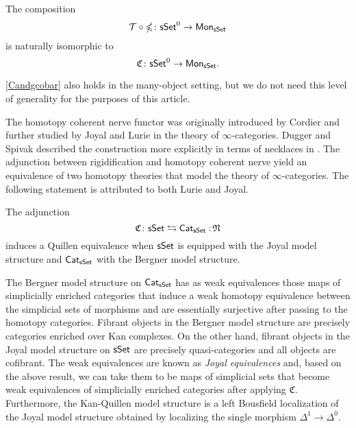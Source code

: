
\begin{proposition}\label{Candgcobar}
	The composition 
	$$\mathcal{T} \circ \operatorname{\mathbb{\Omega}} \colon \mathsf{sSet}^0 \to \mathsf{Mon}_{\mathsf{sSet}}$$ is naturally isomorphic to
	$$\mathfrak{C} \colon \mathsf{sSet}^0 \to \mathsf{Mon}_{\mathsf{sSet}}.$$
\end{proposition}

\cref{Candgcobar} also holds in the many-object setting, but we do not need this level of generality for the purposes of this article.

The homotopy coherent nerve functor was originally introduced by Cordier and further studied by Joyal and Lurie in the theory of $\infty$-categories.
Dugger and Spivak described the construction more explicitly in terms of necklaces in \cite{dugger2011rigidification}.
The adjunction between rigidification and homotopy coherent nerve yield an equivalence of two homotopy theories that model the theory of $\infty$-categories.
The following statement is attributed to both Lurie and Joyal.

\begin{theorem} \label{joyalbergner}
	The adjunction $$ \mathfrak{C} \colon \mathsf{sSet} \leftrightarrows \mathsf{Cat}_{\mathsf{sSet}} :\!\mathfrak{N}$$ induces a Quillen equivalence when $\mathsf{sSet}$ is equipped with the Joyal model structure and $\mathsf{Cat}_{\mathsf{sSet}}$ with the Bergner model structure.
\end{theorem}


\begin{remark}
	The Bergner model structure on $\mathsf{Cat}_{\mathsf{sSet}}$ has as weak equivalences those maps of simplicially enriched categories that induce a weak homotopy equivalence between the simplicial sets of morphisms and are essentially surjective after passing to the homotopy categories.
	Fibrant objects in the Bergner model structure are precisely categories enriched over Kan complexes.
	On the other hand, fibrant objects in the Joyal model structure on $\mathsf{sSet}$ are precisely quasi-categories and all objects are cofibrant.
	The weak equivalences are known as \textit{Joyal equivalences} and, based on the above result, we can take them to be maps of simplicial sets that become weak equivalences of simplicially enriched categories after applying $\mathfrak{C}$.
	Furthermore, the Kan-Quillen model structure is a left Bousfield localization of the Joyal model structure obtained by localizing the single morphism $\Delta^1 \to \Delta^0$.
\end{remark}


